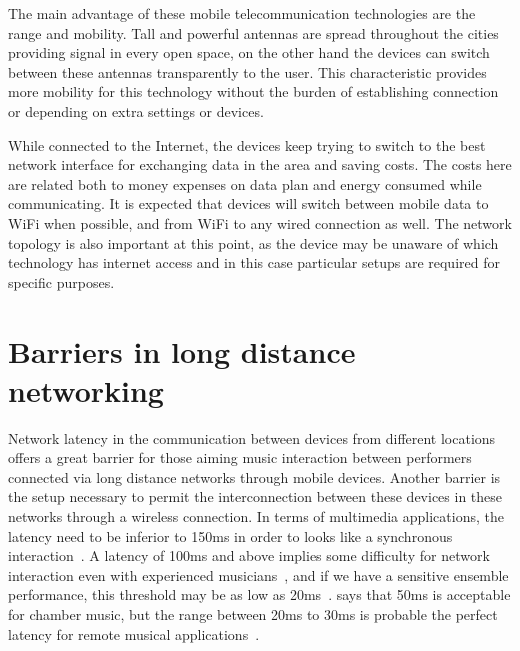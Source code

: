 The main advantage of these mobile telecommunication technologies are the range and mobility.
Tall and powerful antennas are spread throughout the cities providing signal in every open space, on the other hand the devices can switch between these antennas transparently to the user.
This characteristic provides more mobility for this technology without the burden of establishing connection or depending on extra settings or devices.

While connected to the Internet, the devices keep trying to switch to the best network interface for exchanging data in the area and saving costs.
The costs here are related both to money expenses on data plan and energy consumed while communicating.
It is expected that devices will switch between mobile data to WiFi when possible, and from WiFi to any wired connection as well.
The network topology is also important at this point, as the device may be unaware of which technology has internet access and in this case particular setups are required for specific purposes.


















\section{Barriers in long distance networking}

Network latency in the communication between devices from different locations offers a great barrier for those aiming music interaction between performers connected via long distance networks through mobile devices.
Another barrier is the setup necessary to permit the interconnection between these devices in these networks through a wireless connection. 
In terms of multimedia applications, the latency need to be inferior to 150ms in order to looks like a synchronous interaction~\citep{Coulouris2011distributed}.
A latency of 100ms and above implies some difficulty for network interaction even with experienced musicians~\citep{Bartlette2006networkeffect}, and if we have a sensitive ensemble performance, this threshold may be as low as 20ms~\citep{Chafe2004network}.
\cite{Lago2004thequest} says that 50ms is acceptable for chamber music, but the range between 20ms to 30ms is probable the perfect latency for remote musical applications~\citep{Lago2004thequest}. 

